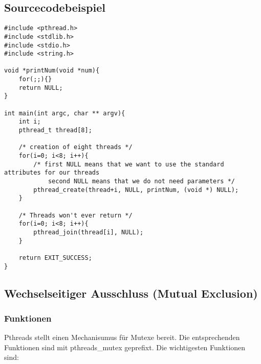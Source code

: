 \documentclass[11pt,a4paper]{article}
\begin{document}
\subsection{Sourcecodebeispiel}
\begin{lstlisting}[name=Thread Management]
#include <pthread.h>
#include <stdlib.h>
#include <stdio.h>
#include <string.h>

void *printNum(void *num){
	for(;;){}
	return NULL;
}

int main(int argc, char ** argv){
	int i;
	pthread_t thread[8];

	/* creation of eight threads */
	for(i=0; i<8; i++){
		/* first NULL means that we want to use the standard attributes for our threads
			second NULL means that we do not need parameters */
		pthread_create(thread+i, NULL, printNum, (void *) NULL);
	}

	/* Threads won't ever return */
	for(i=0; i<8; i++){
		pthread_join(thread[i], NULL);
	}

	return EXIT_SUCCESS;
}
\end{lstlisting}

\subsection{Wechselseitiger Ausschluss (Mutual Exclusion)}
\subsubsection{Funktionen}

Pthreads stellt einen Mechanisumus für Mutexe bereit. Die entsprechenden Funktionen sind mit pthreads\_mutex geprefixt. Die wichtigesten Funktionen sind:
\end{document}

